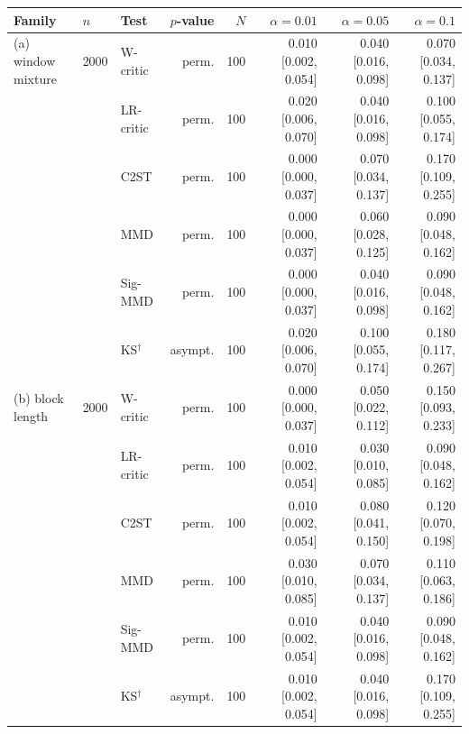\begin{tabular}{lllrrrrr}
\toprule
Family & $n$ & Test & $p$-value & $N$ & $\alpha=0.01$ & $\alpha=0.05$ & $\alpha=0.1$ \\
\midrule
(a) window mixture & 2000 & W-critic & perm. & 100 & 0.010 [0.002, 0.054] & 0.040 [0.016, 0.098] & 0.070 [0.034, 0.137] \\
 &  & LR-critic & perm. & 100 & 0.020 [0.006, 0.070] & 0.040 [0.016, 0.098] & 0.100 [0.055, 0.174] \\
 &  & C2ST & perm. & 100 & 0.000 [0.000, 0.037] & 0.070 [0.034, 0.137] & 0.170 [0.109, 0.255] \\
 &  & MMD & perm. & 100 & 0.000 [0.000, 0.037] & 0.060 [0.028, 0.125] & 0.090 [0.048, 0.162] \\
 &  & Sig-MMD & perm. & 100 & 0.000 [0.000, 0.037] & 0.040 [0.016, 0.098] & 0.090 [0.048, 0.162] \\
 &  & KS$^{\dagger}$ & asympt. & 100 & 0.020 [0.006, 0.070] & 0.100 [0.055, 0.174] & 0.180 [0.117, 0.267] \\
(b) block length & 2000 & W-critic & perm. & 100 & 0.000 [0.000, 0.037] & 0.050 [0.022, 0.112] & 0.150 [0.093, 0.233] \\
 &  & LR-critic & perm. & 100 & 0.010 [0.002, 0.054] & 0.030 [0.010, 0.085] & 0.090 [0.048, 0.162] \\
 &  & C2ST & perm. & 100 & 0.010 [0.002, 0.054] & 0.080 [0.041, 0.150] & 0.120 [0.070, 0.198] \\
 &  & MMD & perm. & 100 & 0.030 [0.010, 0.085] & 0.070 [0.034, 0.137] & 0.110 [0.063, 0.186] \\
 &  & Sig-MMD & perm. & 100 & 0.010 [0.002, 0.054] & 0.040 [0.016, 0.098] & 0.090 [0.048, 0.162] \\
 &  & KS$^{\dagger}$ & asympt. & 100 & 0.010 [0.002, 0.054] & 0.040 [0.016, 0.098] & 0.170 [0.109, 0.255] \\
\bottomrule
\end{tabular}
